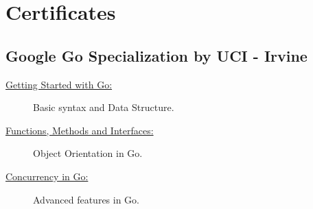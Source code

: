 \documentclass[letterpaper]{../cls/twentysecondcvenglish} %
\begin{document}
\vspace{0.2cm}







\newpage %

\makeprofileNoExtra %

\section{\LARGE{Certificates}}
\subsection{\textbf{Google Go Specialization by UCI - Irvine}}
\begin{description}
\item[\href{https://buddhilw.github.io/bug-free-fiesta/}{Getting Started with Go:}] Basic syntax and Data Structure.
\item[\href{https://buddhilw.github.io/bug-free-fiesta/}{Functions, Methods and Interfaces:}] Object Orientation in Go.
\item[\href{https://buddhilw.github.io/bug-free-fiesta/}{Concurrency in Go:}] Advanced features in Go.
\end{description}
\vspace{10mm}
\end{document}
